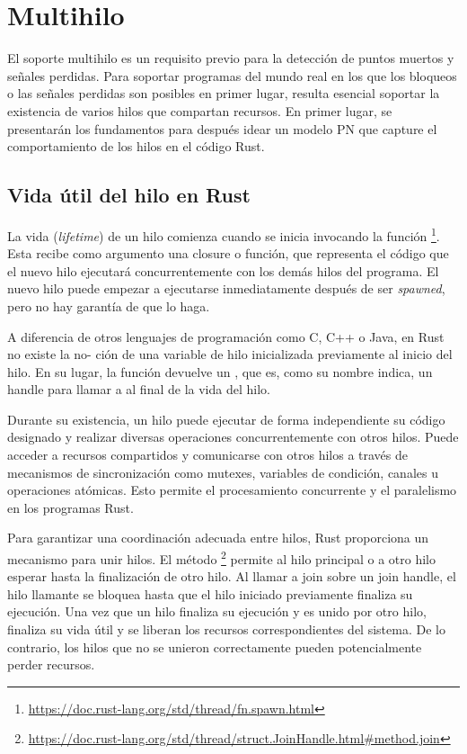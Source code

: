 \section{Multihilo}

El soporte multihilo es un requisito previo para la detección de puntos muertos y señales
perdidas. Para soportar programas del mundo real en los que los bloqueos o las señales
perdidas son posibles en primer lugar, resulta esencial soportar la existencia de varios hilos que
compartan recursos. En primer lugar, se presentarán los fundamentos para después idear un
modelo \acrshort{PN} que capture el comportamiento de los hilos en el código Rust.

\subsection{Vida útil del hilo en Rust}

La vida (\textit{lifetime}) de un hilo comienza cuando se inicia invocando la función
\footnote{\url{https://doc.rust-lang.org/std/thread/fn.spawn.html}}.
Esta recibe como argumento una closure o función, que representa el
código que el nuevo hilo ejecutará concurrentemente con los demás hilos del programa. El
nuevo hilo puede empezar a ejecutarse inmediatamente después de ser \emph{spawned},
pero no hay garantía de que lo haga.

A diferencia de otros lenguajes de programación como C, C++ o Java, en Rust no existe la
no- ción de una variable de hilo inicializada previamente al inicio del hilo. En su lugar, la
función  devuelve un , que es, como su nombre
indica, un handle para llamar a  al final de la vida del hilo.

Durante su existencia, un hilo puede ejecutar de forma independiente su código designado y
realizar diversas operaciones concurrentemente con otros hilos. Puede acceder a recursos
compartidos y comunicarse con otros hilos a través de mecanismos de sincronización como
mutexes, variables de condición, canales u operaciones atómicas. Esto permite el
procesamiento concurrente y el paralelismo en los programas Rust.

Para garantizar una coordinación adecuada entre hilos, Rust proporciona un mecanismo
para unir hilos.
El método \footnote{\url{https://doc.rust-lang.org/std/thread/struct.JoinHandle.html\#method.join}}
permite al hilo principal o a otro hilo
esperar hasta la finalización de otro hilo. Al llamar a join sobre un join handle, el hilo
llamante se bloquea hasta que el hilo iniciado previamente finaliza su ejecución. Una vez que un hilo
finaliza su ejecución y es unido por otro hilo, finaliza su vida útil y se liberan los recursos
correspondientes del sistema. De lo contrario, los hilos que no se unieron correctamente
pueden potencialmente perder recursos.

